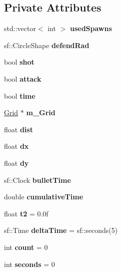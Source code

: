 \subsection*{Private Attributes}
\begin{DoxyCompactItemize}
\item 
\mbox{\label{class_nests_a79af2d2666f61120964f8617d69923af}} 
std\+::vector$<$ int $>$ {\bfseries used\+Spawns}
\item 
\mbox{\label{class_nests_a815d61cb73c4c8b5e6d81659910bca5c}} 
sf\+::\+Circle\+Shape {\bfseries defend\+Rad}
\item 
\mbox{\label{class_nests_a968b732d1583c20b595bda0441c1a5b8}} 
bool {\bfseries shot}
\item 
\mbox{\label{class_nests_a53331ada104f0fdefd4983e44b2eeefd}} 
bool {\bfseries attack}
\item 
\mbox{\label{class_nests_a6b29f7ac60a1f8be8dbe3e2c058c9bbd}} 
bool {\bfseries time}
\item 
\mbox{\label{class_nests_a49ec5c5da63d642bae141d1353037cc9}} 
\mbox{\hyperlink{class_grid}{Grid}} $\ast$ {\bfseries m\+\_\+\+Grid}
\item 
\mbox{\label{class_nests_a5fe276e5cc0d5642238e0f8b57f36946}} 
float {\bfseries dist}
\item 
\mbox{\label{class_nests_a56281e38587115e46391dd3824fbd84d}} 
float {\bfseries dx}
\item 
\mbox{\label{class_nests_aa7d2eff8eff0e13035ac4de61d0edb33}} 
float {\bfseries dy}
\item 
\mbox{\label{class_nests_a4ecdd359f6038aa0765c1666ea54887b}} 
sf\+::\+Clock {\bfseries bullet\+Time}
\item 
\mbox{\label{class_nests_ad5c6a0818985e0bb33254fe88e6705f0}} 
double {\bfseries cumulative\+Time}
\item 
\mbox{\label{class_nests_a78f5940ae696fbba93aeedfd29b11a65}} 
float {\bfseries t2} = 0.\+0f
\item 
\mbox{\label{class_nests_a75147ac5c7c2ad03180c17ecce4b3e42}} 
sf\+::\+Time {\bfseries delta\+Time} = sf\+::seconds(5)
\item 
\mbox{\label{class_nests_a0abac4455774d103708df5811b3c9008}} 
int {\bfseries count} = 0
\item 
\mbox{\label{class_nests_a11e3e93b955cad6817f3857f24996b40}} 
int {\bfseries seconds} = 0
\end{DoxyCompactItemize}



